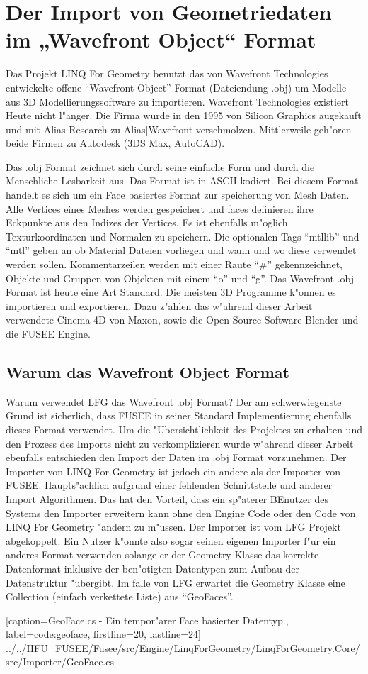 \documentclass[pagesize, paper=a4, fontsize=12pt,titlepage=true, headings=small, headnosepline, abstractoff, liststotoc, nochapterprefix, plainheadsepline]{scrreprt}
\newcommand{\LFGS}{LINQ For Geometry }
\begin{document}
	\section {Der Import von Geometriedaten im „Wavefront Object“ Format}
		Das Projekt \LFGS benutzt das von Wavefront Technologies entwickelte offene "`Wavefront Object"' Format (Dateiendung .obj) um Modelle aus 3D Modellierungssoftware zu importieren. Wavefront Technologies existiert Heute nicht l"anger. Die Firma wurde in den 1995 von Silicon Graphics augekauft und mit Alias Research zu Alias|Wavefront verschmolzen. Mittlerweile geh"oren beide Firmen zu Autodesk (3DS Max, AutoCAD).

Das .obj Format zeichnet sich durch seine einfache Form und durch die Menschliche Lesbarkeit aus. Das Format ist in ASCII kodiert. Bei diesem Format handelt es sich um ein Face basiertes Format zur speicherung von Mesh Daten. Alle Vertices eines Meshes werden gespeichert und faces definieren ihre Eckpunkte aus den Indizes der Vertices. Es ist ebenfalls m"oglich Texturkoordinaten und Normalen zu speichern. Die optionalen Tags "`mtllib"' und "`mtl"' geben an ob Material Dateien vorliegen und wann und wo diese verwendet werden sollen. Kommentarzeilen werden mit einer Raute "`\#"' gekennzeichnet, Objekte und Gruppen von Objekten mit einem "`o"' und "`g"'. Das Wavefront .obj Format ist heute eine Art Standard. Die meisten 3D Programme k"onnen es importieren und exportieren. Dazu z"ahlen das w"ahrend dieser Arbeit verwendete Cinema 4D von Maxon, sowie die Open Source Software Blender und die FUSEE Engine.
		\subsection {Warum das Wavefront Object Format}
			Warum verwendet LFG das Wavefront .obj Format? Der am schwerwiegenste Grund ist sicherlich, dass FUSEE in seiner Standard Implementierung ebenfalls dieses Format verwendet. Um die "Ubersichtlichkeit des Projektes zu erhalten und den Prozess des Imports nicht zu verkomplizieren wurde w"ahrend dieser Arbeit ebenfalls entschieden den Import der Daten im .obj Format vorzunehmen. Der Importer von \LFGS ist jedoch ein andere als der Importer von FUSEE. Haupts"achlich aufgrund einer fehlenden Schnittstelle und anderer Import Algorithmen. Das hat den Vorteil, dass ein sp"aterer BEnutzer des Systems den Importer erweitern kann ohne den Engine Code oder den Code von \LFGS "andern zu m"ussen. Der Importer ist vom LFG Projekt abgekoppelt. Ein Nutzer k"onnte also sogar seinen eigenen Importer f"ur ein anderes Format verwenden solange er der Geometry Klasse das korrekte Datenformat inklusive der ben"otigten Datentypen zum Aufbau der Datenstruktur "ubergibt. Im falle von LFG erwartet die Geometry Klasse eine Collection (einfach verkettete Liste) aus "`GeoFaces"'.

			[caption={GeoFace.cs - Ein tempor"arer Face basierter Datentyp.}, label=code:geoface, firstline=20, lastline=24]
			{../../HFU_FUSEE/Fusee/src/Engine/LinqForGeometry/LinqForGeometry.Core/src/Importer/GeoFace.cs}
\end{document}

